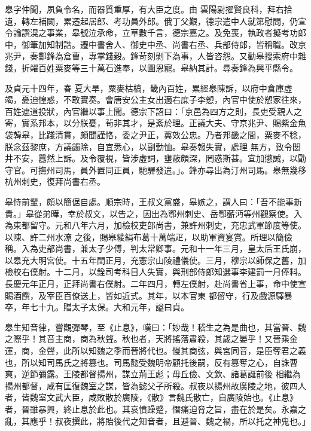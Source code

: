 \begin{pinyinscope}
 皋字仲聞，夙負令名，而器質重厚，有大臣之度。由
 雲陽尉擢賢良科，拜右拾遺，轉左補闕，累遷起居郎、考功員外郎。俄丁父艱，德宗遣中人就第慰問，仍宣令論譔滉之事業，皋號泣承命，立草數千言，德宗嘉之。及免喪，執政者擬考功郎中，御筆加知制誥。遷中書舍人、御史中丞、尚書右丞、兵部侍郎，皆稱職。改京兆尹，奏鄭鋒為倉曹，專掌錢穀。鋒苛刻剝下為事，人皆咨怨。又勸皋搜索府中雜錢，折糴百姓粟麥等三十萬石進奉，以圖恩寵。皋納其計。尋奏鋒為興平縣令。



 及貞元十四年，春
 夏大旱，粟麥枯槁，畿內百姓，累經皋陳訴，以府中倉庫虛竭，憂迫惶惑，不敢實奏。會唐安公主女出適右庶子李愬，內官中使於愬家往來，百姓遮道投狀，內官繼以事上聞。德宗下詔曰：「京邑為四方之則，長吏受親人之寄，實系邦本，以分朕憂，茍非其才，是紊於理。正議大夫、守京兆尹、賜紫金魚袋韓皋，比踐清貫，頗聞謹恪，委之尹正，冀效公忠。乃者邦畿之間，粟麥不稔，朕念茲黎庶，方議蠲除，自宜悉心，以副勤恤。皋奏報失實，處理
 無方，致令閭井不安，囂然上訴。及令覆視，皆涉虛詞，壅蔽頗深，罔惑斯甚。宜加懲誡，以勖守官。可撫州司馬，員外置同正員，馳驛發遣。」。鋒亦尋出為汀州司馬。皋無幾移杭州刺史，復拜尚書右丞。



 皋恃前輩，頗以簡倨自處。順宗時，王叔文黨盛，皋嫉之，謂人曰：「吾不能事新貴。」皋從弟曄，幸於叔文，以告之，因出為鄂州刺史、岳鄂蘄沔等州觀察使。入為東都留守。元和八年六月，加檢校吏部尚書，兼許州刺史，充忠武軍節度等使。以陳、許二州水潦
 之後，賜皋綾絹布葛十萬端疋，以助軍資宴賞。所理以簡儉稱。入為吏部尚書，兼太子少傅，判太常卿事。元和十一年三月，皇太后王氏崩，以皋充大明宮使。十五年閏正月，充憲宗山陵禮儀使。三月，穆宗以師保之舊，加檢校右僕射。十二月，以銓司考科目人失實，與刑部侍郎知選事李建罰一月俸料。長慶元年正月，正拜尚書右僕射。二年四月，轉左僕射，赴尚書省上事，命中使宣賜酒饌，及宰臣百僚送上，皆如近式。其年，以本官東
 都留守，行及戲源驛暴卒，年七十九。贈太子太保。大和元年，謚曰貞。



 皋生知音律，嘗觀彈琴，至《止息》，嘆曰：「妙哉！嵇生之為是曲也，其當晉、魏之際乎！其音主商，商為秋聲。秋也者，天將搖落肅殺，其歲之晏乎！又晉乘金運，商，金聲，此所以知魏之季而晉將代也。慢其商弦，與宮同音，是臣奪君之義也，所以知司馬氏之將篡也。司馬懿受魏明帝顧托後嗣，反有篡奪之心，自誅曹爽，逆節彌露。王陵都督揚州，謀立荊王彪；毋丘儉、文欽、諸葛誕前後
 相繼為揚州都督，咸有匡復魏室之謀，皆為懿父子所殺。叔夜以揚州故廣陵之地，彼四人者，皆魏室文武大臣，咸敗散於廣陵，《散》言魏氏散亡，自廣陵始也。《止息》者，晉雖暴興，終止息於此也。其哀憤躁蹙，憯痛迫脅之旨，盡在於是矣。永嘉之亂，其應乎！叔夜撰此，將貽後代之知音者，且避晉、魏之禍，所以托之神鬼也。」




\end{pinyinscope}
